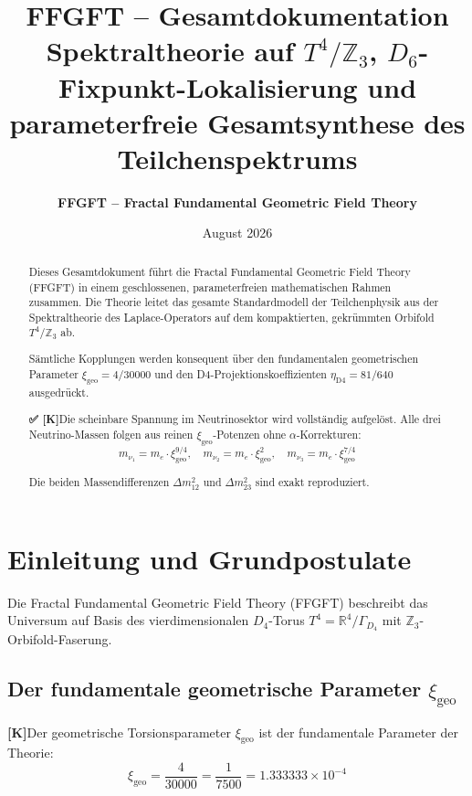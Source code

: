 \documentclass[11pt,a4paper]{article}
\title{\textbf{FFGFT -- Gesamtdokumentation}\\
	\large Spektraltheorie auf $T^4/\mathbb{Z}_3$, $D_6$-Fixpunkt-Lokalisierung und parameterfreie Gesamtsynthese des Teilchenspektrums}
\author{\textbf{FFGFT -- Fractal Fundamental Geometric Field Theory}}
\date{August 2026}
\newcommand{\xigeo}{\xi_{\text{geo}}}
\newcommand{\etaDfour}{\eta_{\text{D4}}}
\newcommand{\Kstatus}{\textbf{[K]}}
\newcommand{\Checkmark}{\textbf{✅ [K]}}
\begin{document}
	
	\maketitle
	
	\begin{abstract}
		Dieses Gesamtdokument führt die Fractal Fundamental Geometric Field Theory (FFGFT) in einem geschlossenen, parameterfreien mathematischen Rahmen zusammen. Die Theorie leitet das gesamte Standardmodell der Teilchenphysik aus der Spektraltheorie des Laplace-Operators auf dem kompaktierten, gekrümmten Orbifold $T^4/\mathbb{Z}_3$ ab.
		
		Sämtliche Kopplungen werden konsequent über den fundamentalen geometrischen Parameter $\xigeo = 4/30000$ und den D4-Projektionskoeffizienten $\etaDfour = 81/640$ ausgedrückt.
		
		\Checkmark Die scheinbare Spannung im Neutrinosektor wird vollständig aufgelöst. Alle drei Neutrino-Massen folgen aus reinen $\xigeo$-Potenzen ohne $\alpha$-Korrekturen:
		\begin{equation}
			m_{\nu_1} = m_e \cdot \xigeo^{9/4}, \quad
			m_{\nu_2} = m_e \cdot \xigeo^{2}, \quad
			m_{\nu_3} = m_e \cdot \xigeo^{7/4}
		\end{equation}
		
		Die beiden Massendifferenzen $\Delta m_{12}^2$ und $\Delta m_{23}^2$ sind exakt reproduziert.
	\end{abstract}
	
	\tableofcontents
	\newpage
	
	\section{Einleitung und Grundpostulate}
	
	Die Fractal Fundamental Geometric Field Theory (FFGFT) beschreibt das Universum auf Basis des vierdimensionalen $D_4$-Torus $T^4 = \mathbb{R}^4/\Gamma_{D_4}$ mit $\mathbb{Z}_3$-Orbifold-Faserung.
	
	\subsection{Der fundamentale geometrische Parameter $\xigeo$}
	
	\Kstatus Der geometrische Torsionsparameter $\xigeo$ ist der fundamentale Parameter der Theorie:
	\begin{equation}
		\xigeo = \frac{4}{30000} = \frac{1}{7500} = 1.333333 \times 10^{-4}
	\end{equation}
	
\end{document}
